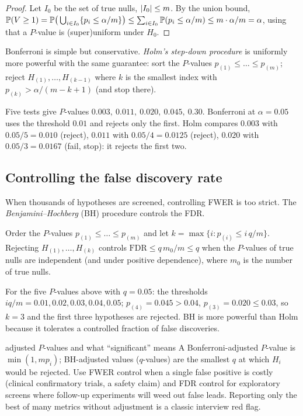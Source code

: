 \begin{proof}
Let $I_0$ be the set of true nulls, $\lvert I_0\rvert\le m$. By the union bound, $\mathbb{P}(V\ge1)=\mathbb{P}\big(\bigcup_{i\in I_0}\{p_i\le\alpha/m\}\big)\le\sum_{i\in I_0}\mathbb{P}(p_i\le\alpha/m)\le m\cdot\alpha/m=\alpha$, using that a $P$-value is (super)uniform under $H_0$.
\end{proof}

Bonferroni is simple but conservative. \emph{Holm's step-down procedure} is uniformly more powerful with the same guarantee: sort the $P$-values $p_{(1)}\le\dots\le p_{(m)}$; reject $H_{(1)},\dots,H_{(k-1)}$ where $k$ is the smallest index with $p_{(k)}>\alpha/(m-k+1)$ (and stop there).

\begin{example}
Five tests give $P$-values $0.003,\ 0.011,\ 0.020,\ 0.045,\ 0.30$. Bonferroni at $\alpha=0.05$ uses the threshold $0.01$ and rejects only the first. Holm compares $0.003$ with $0.05/5=0.010$ (reject), $0.011$ with $0.05/4=0.0125$ (reject), $0.020$ with $0.05/3=0.0167$ (fail, stop): it rejects the first two.
\end{example}

\subsection{Controlling the false discovery rate}

When thousands of hypotheses are screened, controlling FWER is too strict. The \emph{Benjamini--Hochberg} (BH) procedure controls the FDR.

\begin{theorem}\label{thm:bh}
Order the $P$-values $p_{(1)}\le\dots\le p_{(m)}$ and let $k=\max\{i:p_{(i)}\le i\,q/m\}$. Rejecting $H_{(1)},\dots,H_{(k)}$ controls $\mathrm{FDR}\le q\,m_0/m\le q$ when the $P$-values of true nulls are independent (and under positive dependence), where $m_0$ is the number of true nulls.
\end{theorem}

For the five $P$-values above with $q=0.05$: the thresholds $iq/m=0.01,0.02,0.03,0.04,0.05$; $p_{(4)}=0.045>0.04$, $p_{(3)}=0.020\le0.03$, so $k=3$ and the first three hypotheses are rejected. BH is more powerful than Holm because it tolerates a controlled fraction of false discoveries.

\begin{interview}{adjusted $P$-values and what ``significant'' means}
A Bonferroni-adjusted $P$-value is $\min(1,mp_i)$; BH-adjusted values ($q$-values) are the smallest $q$ at which $H_i$ would be rejected. Use FWER control when a single false positive is costly (clinical confirmatory trials, a safety claim) and FDR control for exploratory screens where follow-up experiments will weed out false leads. Reporting only the best of many metrics without adjustment is a classic interview red flag.
\end{interview}

